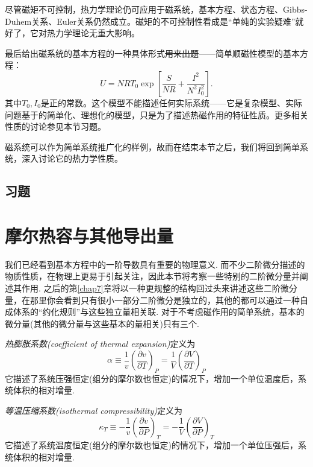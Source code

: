 尽管磁矩不可控制，热力学理论仍可应用于磁系统，基本方程、状态方程、Gibbs-Duhem关系、Euler关系仍然成立。磁矩的不可控制性看成是“单纯的实验疑难”就好了，它对热力学理论无重大影响。

最后给出磁系统的基本方程的一种具体形式\sout{用来出题}——简单顺磁性模型的基本方程：
\begin{equation}
    U = NRT_0 \exp \left[ \frac{S}{NR} + \frac{I^2}{N^2 I_0^2} \right].
\label{equ3.66}
\end{equation}
其中$T_0, I_0$是正的常数。这个模型不能描述任何实际系统——它是复杂模型、实际问题基于的简单化、理想化的模型，只是为了描述热磁作用的特征性质。更多相关性质的讨论参见本节习题。

磁系统可以作为简单系统推广化的样例，故而在结束本节之后，我们将回到简单系统，深入讨论它的热力学性质。

\subsection*{习题}


\section{摩尔热容与其他导出量}
\label{sec3.9}
我们已经看到基本方程中的一阶导数具有重要的物理意义. 而不少二阶微分描述的物质性质，在物理上更易于引起关注，因此本节将考察一些特别的二阶微分量并阐述其作用. 之后的第\ref{chap7}章将以一种更规整的结构回过头来讲述这些二阶微分量，在那里你会看到只有很小一部分二阶微分是独立的，其他的都可以通过一种自成体系的“约化规则”与这些独立量相关联. 对于不考虑磁作用的简单系统，基本的微分量(其他的微分量与这些基本的量相关)只有三个.

{\it 热膨胀系数(coefficient of thermal expansion)}定义为
\begin{equation}
\label{equ3.67}
\alpha \equiv \frac{1}{v}\left(\frac{\partial v}{\partial T}\right)_P=\frac{1}{V}\left(\frac{\partial V}{\partial T}\right)_P
\end{equation}
它描述了系统压强恒定(组分的摩尔数也恒定)的情况下，增加一个单位温度后，系统体积的相对增量.

{\it 等温压缩系数(isothermal compressibility)}定义为
\begin{equation}
\label{equ3.68}
\kappa_T\equiv-\frac{1}{v}\left(\frac{\partial v}{\partial P}\right)_T= -\frac{1}{V}\left(\frac{\partial V}{\partial P}\right)_T
\end{equation}
它描述了系统温度恒定(组分的摩尔数也恒定)的情况下，增加一个单位压强后，系统体积的相对增量.

